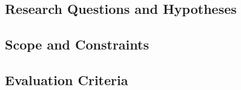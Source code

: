 \subsection{Research Questions and Hypotheses}
\label{sec:rq-hypotheses}

\subsection{Scope and Constraints}
\label{sec:scope}

\subsection{Evaluation Criteria}
\label{sec:evaluation-criteria}
